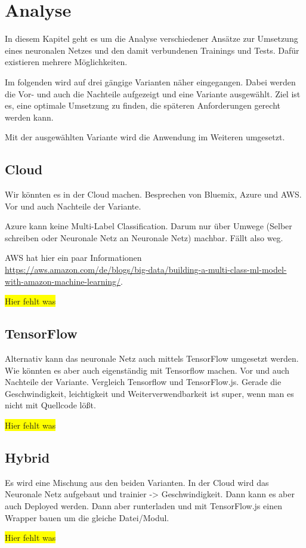 \section{Analyse}
\label{sec:analyse}
In diesem Kapitel geht es um die Analyse verschiedener Ansätze zur Umsetzung eines neuronalen Netzes und den damit
verbundenen Trainings und Tests. Dafür existieren mehrere Möglichkeiten.

Im folgenden wird auf drei gängige Varianten näher eingegangen. Dabei werden die Vor- und auch die Nachteile aufgezeigt
und eine Variante ausgewählt. Ziel ist es, eine optimale Umsetzung zu finden, die späteren Anforderungen gerecht werden kann.

Mit der ausgewählten Variante wird die Anwendung im Weiteren umgesetzt.

\subsection{Cloud}
Wir könnten es in der Cloud machen. Besprechen von Bluemix, Azure und AWS. Vor und auch Nachteile der Variante.

Azure kann keine Multi-Label Classification. Darum nur über Umwege (Selber schreiben oder Neuronale Netz an Neuronale Netz)
machbar. Fällt also weg.

AWS hat hier ein paar Informationen\\
\url{https://aws.amazon.com/de/blogs/big-data/building-a-multi-class-ml-model-with-amazon-machine-learning/}.

\colorbox{yellow}{Hier fehlt was}

\subsection{TensorFlow}
Alternativ kann das neuronale Netz auch mittels TensorFlow umgesetzt werden.
Wie könnten es aber auch eigenständig mit Tensorflow machen. Vor und auch Nachteile der Variante. Vergleich Tensorflow
und TensorFlow.js. Gerade die Geschwindigkeit, leichtigkeit und Weiterverwendbarkeit ist super, wenn man es nicht mit
Quellcode lößt.

\colorbox{yellow}{Hier fehlt was}

\subsection{Hybrid}
Es wird eine Mischung aus den beiden Varianten. In der Cloud wird das Neuronale Netz aufgebaut und trainier -> Geschwindigkeit.
Dann kann es aber auch Deployed werden. Dann aber runterladen und mit TensorFlow.js einen Wrapper bauen um die gleiche
Datei/Modul.

\colorbox{yellow}{Hier fehlt was}